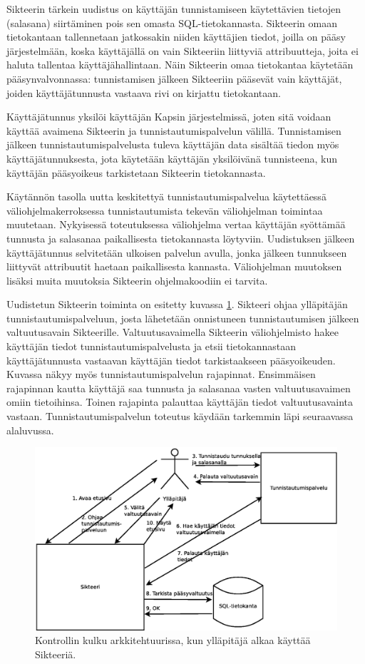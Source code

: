 Sikteerin tärkein uudistus on käyttäjän tunnistamiseen käytettävien tietojen (salasana) siirtäminen pois sen omasta SQL-tietokannasta. Sikteerin omaan tietokantaan tallennetaan jatkossakin niiden käyttäjien tiedot, joilla on pääsy järjestelmään, koska käyttäjällä on vain Sikteeriin liittyviä attribuutteja, joita ei haluta tallentaa käyttäjähallintaan. Näin Sikteerin omaa tietokantaa käytetään pääsynvalvonnassa: tunnistamisen jälkeen Sikteeriin pääsevät vain käyttäjät, joiden käyttäjätunnusta vastaava rivi on kirjattu tietokantaan.

Käyttäjätunnus yksilöi käyttäjän Kapsin järjestelmissä, joten sitä voidaan käyttää avaimena Sikteerin ja tunnistautumispalvelun välillä. Tunnistamisen jälkeen tunnistautumispalvelusta tuleva käyttäjän data sisältää tiedon myös käyttäjätunnuksesta, jota käytetään käyttäjän yksilöivänä tunnisteena, kun käyttäjän pääsyoikeus tarkistetaan Sikteerin tietokannasta.

Käytännön tasolla uutta keskitettyä tunnistautumispalvelua käytettäessä väliohjelmakerroksessa tunnistautumista tekevän väliohjelman toimintaa muutetaan. Nykyisessä toteutuksessa väliohjelma vertaa käyttäjän syöttämää tunnusta ja salasanaa paikallisesta tietokannasta löytyviin. Uudistuksen jälkeen käyttäjätunnus selvitetään ulkoisen palvelun avulla, jonka jälkeen tunnukseen liittyvät attribuutit haetaan paikallisesta kannasta. Väliohjelman muutoksen lisäksi muita muutoksia Sikteerin ohjelmakoodiin ei tarvita.

Uudistetun Sikteerin toiminta on esitetty kuvassa \ref{auth_kapsi_fi_flow}. Sikteeri ohjaa ylläpitäjän tunnistautumispalveluun, josta lähetetään onnistuneen tunnistautumisen jälkeen valtuutusavain Sikteerille. Valtuutusavaimella Sikteerin väliohjelmisto hakee käyttäjän tiedot tunnistautumispalvelusta ja etsii tietokannastaan käyttäjätunnusta vastaavan käyttäjän tiedot tarkistaakseen pääsyoikeuden. Kuvassa näkyy myös tunnistautumispalvelun rajapinnat. Ensimmäisen rajapinnan kautta käyttäjä saa tunnusta ja salasanaa vasten valtuutusavaimen omiin tietoihinsa. Toinen rajapinta palauttaa käyttäjän tiedot valtuutusavainta vastaan. Tunnistautumispalvelun toteutus käydään tarkemmin läpi seuraavassa alaluvussa.

\begin{figure}[ht]
\centering
\includegraphics[width=\textwidth]{toteutus/arkkitehtuuri/auth_kapsi_fi_flow.eps}
\caption{Kontrollin kulku arkkitehtuurissa, kun ylläpitäjä alkaa käyttää Sikteeriä.}%
\label{auth_kapsi_fi_flow}
\end{figure}